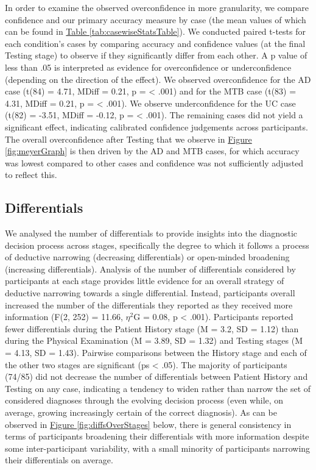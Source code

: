 \documentclass[a4paper, nobind]{templates/ociamthesis}
\begin{document}
\newpage

In order to examine the observed overconfidence in more granularity, we compare confidence and our primary accuracy measure by case (the mean values of which can be found in \hyperref[tab:casewiseStatsTable]{Table \ref{tab:casewiseStatsTable}}). We conducted paired t-tests for each condition's cases by comparing accuracy and confidence values (at the final Testing stage) to observe if they significantly differ from each other. A p value of less than .05 is interpreted as evidence for overconfidence or underconfidence (depending on the direction of the effect). We observed overconfidence for the AD case (t(84) = 4.71, MDiff = 0.21, p = \textless{} .001) and for the MTB case (t(83) = 4.31, MDiff = 0.21, p = \textless{} .001). We observe underconfidence for the UC case (t(82) = -3.51, MDiff = -0.12, p = \textless{} .001). The remaining cases did not yield a significant effect, indicating calibrated confidence judgements across participants. The overall overconfidence after Testing that we observe in \hyperref[fig:meyerGraph]{Figure \ref{fig:meyerGraph}} is then driven by the AD and MTB cases, for which accuracy was lowest compared to other cases and confidence was not sufficiently adjusted to reflect this.

\subsection{Differentials}\label{differentials}

We analysed the number of differentials to provide insights into the diagnostic decision process across stages, specifically the degree to which it follows a process of deductive narrowing (decreasing differentials) or open-minded broadening (increasing differentials). Analysis of the number of differentials considered by participants at each stage provides little evidence for an overall strategy of deductive narrowing towards a single differential. Instead, participants overall increased the number of the differentials they reported as they received more information (F(2, 252) = 11.66, \(\eta^2\)G = 0.08, p \textless{} .001). Participants reported fewer differentials during the Patient History stage (M = 3.2, SD = 1.12) than during the Physical Examination (M = 3.89, SD = 1.32) and Testing stages (M = 4.13, SD = 1.43). Pairwise comparisons between the History stage and each of the other two stages are significant (ps \textless{} .05). The majority of participants (74/85) did not decrease the number of differentials between Patient History and Testing on any case, indicating a tendency to widen rather than narrow the set of considered diagnoses through the evolving decision process (even while, on average, growing increasingly certain of the correct diagnosis). As can be observed in \hyperref[fig:diffsOverStages]{Figure \ref{fig:diffsOverStages}} below, there is general consistency in terms of participants broadening their differentials with more information despite some inter-participant variability, with a small minority of participants narrowing their differentials on average.
\end{document}
